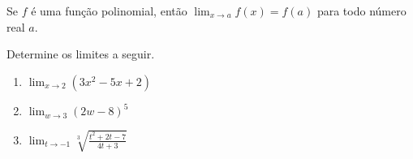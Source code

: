 \begin{frame}
  \begin{theorem}
    Se $f$ é uma função polinomial, então $\lim_{x\rightarrow a}f(x)=f(a)$ para todo número real $a$.
  \end{theorem}
\end{frame}

\begin{frame}
  \begin{example}
    Determine os limites a seguir.
  \end{example}
  \begin{enumerate}
    \item $\displaystyle\lim_{x\rightarrow 2}(3x^{2} - 5x + 2)$\vspace{1.0cm}
    \item $\displaystyle\lim_{w\rightarrow 3}(2w-8)^{5}$\vspace{1.0cm}
    \item $\displaystyle\lim_{t\rightarrow -1}\sqrt[3]{\frac{t^{2}+2t-7}{4t+3}}$
  \end{enumerate}
\end{frame}
